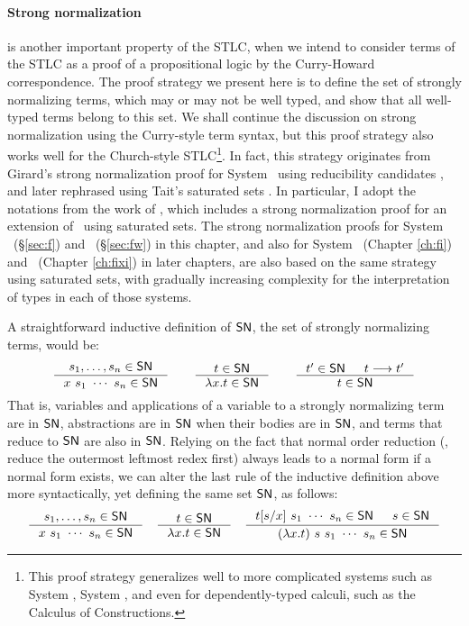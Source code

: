 \paragraph{Strong normalization} is another important property of the STLC,
when we intend to consider terms of the STLC as a proof of a propositional logic
by the Curry-Howard correspondence. The proof strategy we present here is
to define the set of strongly normalizing terms, which may or may not be
well typed, and show that all well-typed terms belong to this set.
We shall continue the discussion on strong normalization using
the Curry-style term syntax, but this proof strategy also works well
for the Church-style STLC\footnote{This proof strategy generalizes well
	to more complicated systems such as System \F, System \Fw, and
	even for dependently-typed calculi, such as
	the Calculus of Constructions\cite{Geuvers94}.}.
In fact, this strategy originates from Girard's strong normalization proof
for System \F\ using reducibility candidates \cite{Gir71}, and later rephrased
using Tait's saturated sets \cite{Tait75}. In particular, I adopt
the notations from the work of \citet{AbeMat04}, which includes
a strong normalization proof for an extension of \Fw\ using saturated sets.
The strong normalization proofs for System \F\ (\S\ref{sec:f}) and
\Fw\ (\S\ref{sec:fw}) in this chapter, and also for System \Fi\
(Chapter \ref{ch:fi}) and \Fixi\ (Chapter \ref{ch:fixi}) in later chapters,
are also based on the same strategy using saturated sets, with gradually
increasing complexity for the interpretation of types in each of those systems.

A straightforward inductive definition of $\mathsf{SN}$,
the set of strongly normalizing terms, would be:
\[
\inference{s_1,\ldots,s_n\in\SN}{x~s_1~\cdots~s_n \in \SN}
\qquad
\inference{t \in \SN}{\l x.t \in \SN}
\qquad
\inference{t' \in \SN & t --> t'}{t \in \SN}
\]
That is, variables and applications of a variable to a strongly normalizing term
are in $\mathsf{SN}$, abstractions are in $\mathsf{SN}$ when their bodies are in $\mathsf{SN}$,
and terms that reduce to $\mathsf{SN}$ are also in $\mathsf{SN}$. Relying on the fact that
normal order reduction (\ie, reduce the outermost leftmost redex first) always
leads to a normal form if a normal form exists, we can alter the last rule of
the inductive definition above more syntactically, yet defining the same set
$\mathsf{SN}$, as follows:
\[
\inference{s_1,\ldots,s_n\in\SN}{x~s_1~\cdots~s_n \in \SN}
\quad
\inference{t \in \SN}{\l x.t \in \SN}
\quad
\inference{t[s/x]~s_1~\cdots~s_n\in \SN & s\in\SN}
	{(\lambda x.t)~s~s_1~\cdots~s_n \in \SN}
\]


